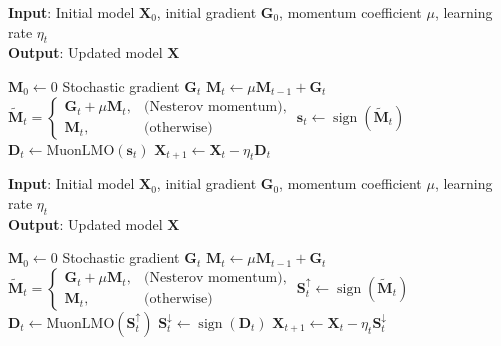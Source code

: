 \documentclass[letterpaper]{article} %
\begin{document}
\begin{algorithm}[!h]
    \caption{Centralized MuonUSign}
    \label{alg:muon_usign}
    \textbf{Input}: Initial model $\mathbf{X}_0$, initial gradient $\mathbf{G}_0$, momentum coefficient $\mu$, learning rate $\eta_t$ \\
    \textbf{Output}: Updated model $\mathbf{X}$ 
    \begin{algorithmic}[1]
    \State $\mathbf{M}_0 \gets 0$ 
        \State Stochastic gradient $\mathbf{G}_t$
        \State $\mathbf{M}_t \gets \mu \mathbf{M}_{t-1} + \mathbf{G}_t$ 
        \State $\tilde{\mathbf{M}}_t =
        \begin{cases} 
            \mathbf{G}_t + \mu \mathbf{M}_t, & \text{(Nesterov momentum)}, \\
            \mathbf{M}_t, & \text{(otherwise)}
        \end{cases}$
        \State $\mathbf{s}_t \gets \operatorname{sign}(\tilde{\mathbf{M}}_t)$ 
        \State $\mathbf{D}_t \gets \mathrm{MuonLMO}(\mathbf{s}_t)$ 
        \State $\mathbf{X}_{t+1} \gets \mathbf{X}_t - \eta_t \mathbf{D}_t$ 
    \EndFor
    \end{algorithmic}
    \end{algorithm}

    \begin{algorithm}[!h]
        \caption{Centralized MuonUDSign (bidirectional)}
        \label{alg:muon_udsign}
        \textbf{Input}: Initial model $\mathbf{X}_0$, initial gradient $\mathbf{G}_0$, momentum coefficient $\mu$, learning rate $\eta_t$ \\
        \textbf{Output}: Updated model $\mathbf{X}$ 
        \begin{algorithmic}[1]
        \State $\mathbf{M}_0 \gets 0$ 
            \State Stochastic gradient $\mathbf{G}_t$
            \State $\mathbf{M}_t \gets \mu \mathbf{M}_{t-1} + \mathbf{G}_t$ 
            \State $\tilde{\mathbf{M}}_t =
            \begin{cases} 
                \mathbf{G}_t + \mu \mathbf{M}_t, & \text{(Nesterov momentum)}, \\
                \mathbf{M}_t, & \text{(otherwise)}
            \end{cases}$
            \State $\mathbf{S}_t^{\uparrow} \gets \operatorname{sign}(\tilde{\mathbf{M}}_t)$ 
            \State $\mathbf{D}_t \gets \mathrm{MuonLMO}(\mathbf{S}_t^{\uparrow})$ 
            \State $\mathbf{S}_t^{\downarrow} \gets \operatorname{sign}(\mathbf{D}_t)$ 
            \State $\mathbf{X}_{t+1} \gets \mathbf{X}_t - \eta_t \mathbf{S}_t^{\downarrow}$ 
        \EndFor
        \end{algorithmic}
\end{algorithm}
    
\end{document}
